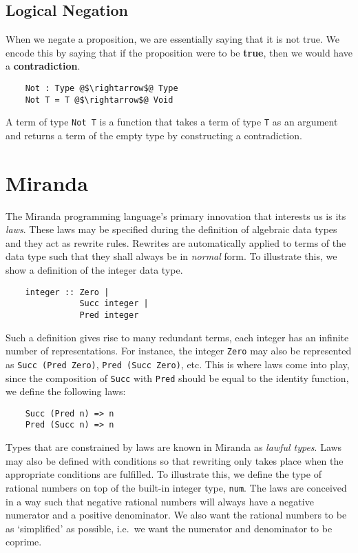\documentclass[12pt,twoside,maitrise]{dms}
\theoremstyle{definition}
\numberwithin{equation}{section}
\numberwithin{table}{chapter}
\numberwithin{figure}{chapter}
\newcommand\id[1] {\texttt{#1}}
\newcommand\fn[1] {\texttt{#1}}
\begin{document}
\subsection*{Logical Negation}\label{subsec:log-neg}

When we negate a proposition, we are essentially saying that it is not true.
We encode this by saying that if the proposition were to be \textbf{true}, then
we would have a \textbf{contradiction}.

\begin{verbatim}
    Not : Type @$\rightarrow$@ Type
    Not T = T @$\rightarrow$@ Void
\end{verbatim}

A term of type \fn{Not T} is a function that takes a term of type \id{T} as an
argument and returns a term of the empty type by constructing a contradiction.

\section{Miranda}

The Miranda programming language's\cite{thompson1986laws, thompson1990lawful}
primary innovation that interests us is its \emph{laws}. These laws may be
specified during the definition of algebraic data types and they act as rewrite
rules. Rewrites are automatically applied to terms of the data type such that
they shall always be in \emph{normal} form. To illustrate this, we show a
definition of the integer data type.

\begin{verbatim}
    integer :: Zero |
               Succ integer |
               Pred integer
\end{verbatim}

Such a definition gives rise to many redundant terms, each integer has an
infinite number of representations. For instance, the integer \id{Zero} may also
be represented as \fn{Succ (Pred Zero)}, \fn{Pred (Succ Zero)}, etc. This is
where laws come into play, since the composition of \id{Succ} with \id{Pred}
should be equal to the identity function, we define the following laws:

\begin{verbatim}
    Succ (Pred n) => n
    Pred (Succ n) => n
\end{verbatim}

Types that are constrained by laws are known in Miranda as \emph{lawful types}.
Laws may also be defined with conditions so that rewriting only takes place when
the appropriate conditions are fulfilled. To illustrate this, we define the type
of rational numbers on top of the built-in integer type, \id{num}. The laws are
conceived in a way such that negative rational numbers will always have a
negative numerator and a positive denominator. We also want the rational numbers
to be as `simplified' as possible, i.e.\ we want the numerator and denominator
to be coprime.
\end{document}
